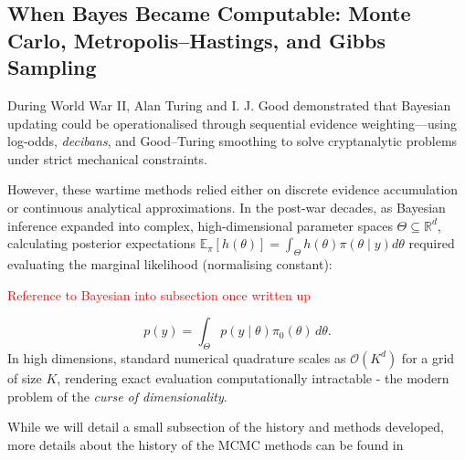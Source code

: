 \subsection{When Bayes Became Computable: Monte Carlo, Metropolis--Hastings, and Gibbs Sampling}
\label{sec:mcmc-history}

During World War II, Alan Turing and I. J. Good demonstrated that Bayesian updating could be operationalised through sequential evidence weighting—using log-odds, \emph{decibans}, and Good--Turing smoothing to solve cryptanalytic problems under strict mechanical constraints. 

However, these wartime methods relied either on discrete evidence accumulation or continuous analytical approximations. In the post-war decades, as Bayesian inference expanded into complex, high-dimensional parameter spaces $\Theta \subseteq \mathbb{R}^d$, calculating posterior expectations $\mathbb{E}_\pi[h(\theta)] = \int_\Theta h(\theta)\pi(\theta \mid y)d\theta$ required evaluating the marginal likelihood (normalising constant):

\textcolor{red}{Reference to Bayesian into subsection once written up}

\begin{equation}
    p(y) = \int_{\Theta} p(y \mid \theta)\pi_{0}(\theta)\,d\theta.
    \label{eq:marginal-likelihood}
\end{equation}
In high dimensions, standard numerical quadrature scales as $\mathcal{O}(K^d)$ for a grid of size $K$, rendering exact evaluation computationally intractable - the modern problem of the \emph{curse of dimensionality}.

While we will detail a small subsection of the history and methods developed, more details about the history of the MCMC methods can be found in \cite{robert2011short, grimmett2014probability, wiki:mcmc, wiki:metropolishastings}


\noindent
{}

